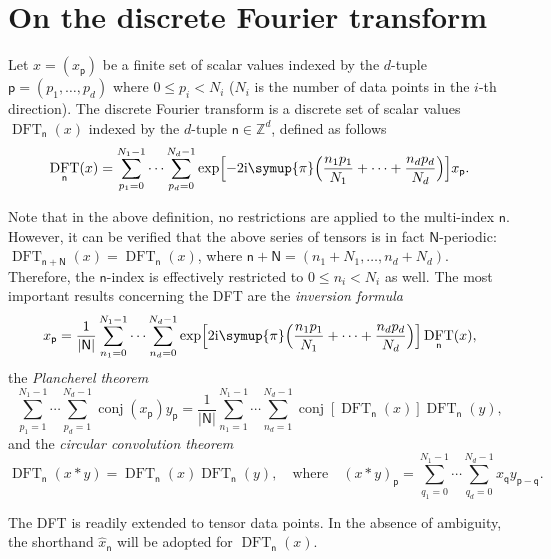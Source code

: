 \documentclass[draft, appendixprefix=true, chapterprefix=true, fontsize=12pt, numbers=noendperiod]{scrbook}
\DeclareMathOperator{\conj}{conj}
\DeclareMathOperator{\dft}{DFT}
\newcommand{\I}{\mathrm{i}}
\newcommand{\integers}{\mathbb{Z}}
\newcommand{\PI}{\symup{\pi}}
\newcommand{\tuple}[1]{\mathsf{#1}}
\begin{document}
\section{On the discrete Fourier transform}

Let \(x=(x_{\tuple{p}})\) be a finite set of scalar values indexed by the
\(d\)-tuple \(\tuple{p}=(p_1, \ldots, p_d)\) where \(0\leq p_i<N_i\) (\(N_i\)
is the number of data points in the \(i\)-th direction). The discrete Fourier
transform is a discrete set of scalar values \(\dft_{\tuple{n}}(x)\)
indexed by the \(d\)-tuple \(\tuple{n}\in\integers^d\), defined as follows
\begin{equation}
  \dft_{\tuple{n}}(x)=\sum_{p_1=0}^{N_1-1}\cdots\sum_{p_d=0}^{N_d-1}\exp
  \Bigl[-2\I\PI\Bigl(\frac{n_1p_1}{N_1}+\cdots+\frac{n_dp_d}{N_d}\Bigr)\Bigr]
  x_{\tuple{p}}.
\end{equation}

Note that in the above definition, no restrictions are applied to the
multi-index \(\tuple{n}\). However, it can be verified that the above series of
tensors is in fact \(\tuple{N}\)-periodic:
\(\dft_{\tuple{n}+\tuple{N}}(x)=\dft_{\tuple{n}}(x)\), where
\(\tuple{n}+\tuple{N}=(n_1+N_1, \ldots, n_d+N_d)\). Therefore, the
\(\tuple{n}\)-index is effectively restricted to \(0\leq n_i<N_i\) as well. The
most important results concerning the DFT are the \emph{inversion formula}
\begin{equation}
  x_{\tuple{p}}=\frac1{\lvert\tuple{N}\rvert}\sum_{n_1=0}^{N_1-1}\cdots
  \sum_{n_d=0}^{N_d-1}\exp\Bigl[2\I\PI\Bigl(\frac{n_1p_1}{N_1}+\cdots+
  \frac{n_dp_d}{N_d}\Bigr)\Bigr]\dft_{\tuple{n}}(x),
\end{equation}
the \emph{Plancherel theorem}
\begin{equation}
  \label{eq:20203128093105}
  \sum_{p_1=1}^{N_1-1}\cdots\sum_{p_d=1}^{N_d-1}\conj(x_{\tuple p})y_{\tuple p}
  =\frac1{\lvert\tuple N\rvert}\sum_{n_1=1}^{N_1-1}\cdots\sum_{n_d=1}^{N_d-1}
  \conj[\dft_{\tuple n}(x)]\dft_{\tuple n}(y),
\end{equation}
and the \emph{circular convolution theorem}
\begin{equation}
  \dft_{\tuple{n}}(x\ast y)=\dft_{\tuple{n}}(x)\dft_{\tuple{n}}(y),
  \quad\text{where}\quad
  (x\ast y)_{\tuple p}=\sum_{q_1=0}^{N_1-1}\cdots\sum_{q_d=0}^{N_d-1}
  x_{\tuple{q}}y_{\tuple{p}-\tuple{q}}.
\end{equation}

The DFT is readily extended to tensor data points. In the absence of ambiguity,
the shorthand \(\hat{x}_{\tuple{n}}\) will be adopted for
\(\dft_{\tuple{n}}(x)\).
\end{document}
